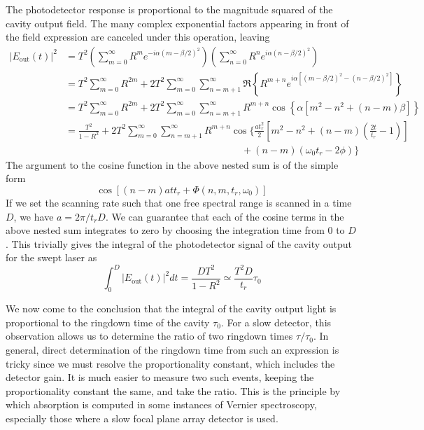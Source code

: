 The photodetector response is proportional to the magnitude squared of the cavity output field. The many complex exponential factors appearing in front of the field expression are canceled under this operation, leaving
\begin{align*}
	\left|E_\mathrm{out}(t)\right|^2 &= T^2\left(\sum_{m=0}^{\infty} R^m e^{-i\alpha (m-\beta/2)^2}\right)\left(\sum_{n=0}^{\infty} R^n e^{i\alpha (n-\beta/2)^2}\right) \\
	&= T^2\sum_{m=0}^{\infty}R^{2m} + 2T^2 \sum_{m=0}^{\infty}\sum_{n=m+1}^{\infty}\Re \left\{R^{m+n} e^{i\alpha\left[(m-\beta/2)^2 - (n-\beta/2)^2\right]}\right\} \\
	&= T^2\sum_{m=0}^{\infty}R^{2m} + 2T^2 \sum_{m=0}^{\infty}\sum_{n=m+1}^{\infty}R^{m+n}\cos \left\{\alpha\left[m^2 - n^2 + (n-m)\beta\right]\right\} \\
	&= \frac{T^2}{1-R^2} + 2T^2 \sum_{m=0}^{\infty}\sum_{n=m+1}^{\infty}R^{m+n}\cos \Bigg\{\frac{at_r^2}{2}\left[m^2 - n^2 + (n-m)\left(\frac{2t}{t_r} - 1\right)\right] \nonumber\\
	&\qquad\qquad\qquad\qquad\qquad\qquad\qquad\qquad\qquad
	+ (n-m)\left(\omega_0 t_r - 2\phi\right)\Bigg\}
\end{align*}
The argument to the cosine function in the above nested sum is of the simple form
\begin{equation*}
	\cos\left[(n-m) a t t_r + \Phi(n,m,t_r,\omega_0)\right]
\end{equation*}
If we set the scanning rate such that one free spectral range is scanned in a time $D$, we have $a=2\pi/t_rD$. We can guarantee that each of the cosine terms in the above nested sum integrates to zero by choosing the integration time from $0$ to $D$. This trivially gives the integral of the photodetector signal of the cavity output for the swept laser as
\begin{equation}
	\int_{0}^{D}\left|E_\mathrm{out}(t)\right|^2 dt = \frac{DT^2}{1-R^2} \simeq \frac{T^2 D}{t_r}\tau_0
\end{equation}

We now come to the conclusion that the integral of the cavity output light is proportional to the ringdown time of the cavity $\tau_0$. For a slow detector, this observation allows us to determine the ratio of two ringdown times $\tau/\tau_0$. In general, direct determination of the ringdown time from such an expression is tricky since we must resolve the proportionality constant, which includes the detector gain. It is much easier to measure two such events, keeping the proportionality constant the same, and take the ratio. This is the principle by which absorption is computed in some instances of Vernier spectroscopy, especially those where a slow focal plane array detector is used.

